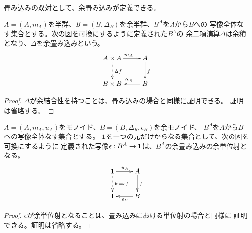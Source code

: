 	畳み込みの双対として、余畳み込みが定義できる。

	\begin{definition}\label{def:余畳み込み} %
		$A=(A,m_A)$を半群、$B=(B,\Delta_B)$を余半群、$B^A$を$A$から$B$への
		写像全体なす集合とする。次の図を可換にするように定義された$B^A$の
		余二項演算$\Delta$は余積となり、$\Delta$を余畳み込みという。
		\begin{equation}\xymatrix{ %
			A \times A \ar@{.>}[d]^{\Delta f} \ar[r]^{m_A} & A \ar[d]^{f} \\
			B \times B & B \ar[l]_{\Delta_B} \\
		}\end{equation} %
	\end{definition} %
	\begin{proof} %
		$\Delta$が余結合性を持つことは、畳み込みの場合と同様に証明できる。
		証明は省略する。
	\end{proof} %

	\begin{proposition}[余畳み込みの単位射]\label{prop:余畳み込みの単位射} %
		$A=(A,m_A,u_A)$をモノイド、$B=(B,\Delta_B,\epsilon_B)$を余モノイド、
		$B^A$を$A$から$B$への写像全体なす集合とする。
		${\mathbf{1}}$を一つの元だけからなる集合として、次の図を可換にするように
		定義された写像$\epsilon:B^A\to {\mathbf{1}}$は、$B^A$の余畳み込みの余単位射となる。
		\begin{equation}\xymatrix{
			\mybf{1} \ar@{.>}[d]^{\myid=\epsilon f} \ar[r]^{u_A} & A \ar[d]^{f} \\
			\mybf{1} & B \ar[l]^{\epsilon_B} \\
		}\end{equation}
	\end{proposition} %
	\begin{proof} %
		$\epsilon$が余単位射となることは、畳み込みにおける単位射の場合と同様に
		証明できる。証明は省略する。
	\end{proof} %

